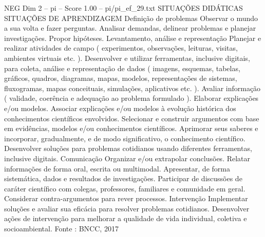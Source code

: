 \begin{textsample}{NEG Dim 2 – pi – Score 1.00 – pi/pi\_ef\_29.txt}  \label{ex:f2_neg_198}
SITUAÇÕES DIDÁTICAS SITUAÇÕES DE APRENDIZAGEM Definição de problemas Observar o mundo a sua volta e fazer perguntas.
Analisar demandas, delinear problemas e planejar investigações.
Propor hipóteses.
Levantamento, análise e representação Planejar e realizar atividades de campo ( experimentos, observações, leituras, visitas, ambientes virtuais etc. ).
Desenvolver e utilizar ferramentas, inclusive digitais, para coleta, análise e representação de dados ( imagens, esquemas, tabelas, gráficos, quadros, diagramas, mapas, modelos, representações de sistemas, fluxogramas, mapas conceituais, simulações, aplicativos etc. ).
Avaliar informação ( validade, coerência e adequação ao problema formulado ).
Elaborar explicações e/ou modelos.
Associar explicações e/ou modelos à evolução histórica dos conhecimentos científicos envolvidos.
Selecionar e construir argumentos com base em evidências, modelos e/ou conhecimentos científicos.
Aprimorar seus saberes e incorporar, gradualmente, e de modo significativo, o conhecimento científico.
Desenvolver soluções para problemas cotidianos usando diferentes ferramentas, inclusive digitais.
Comunicação Organizar e/ou extrapolar conclusões.
Relatar informações de forma oral, escrita ou multimodal.
Apresentar, de forma sistemática, dados e resultados de investigações.
Participar de discussões de caráter científico com colegas, professores, familiares e comunidade em geral.
Considerar contra-argumentos para rever processos.
Intervenção Implementar soluções e avaliar sua eficácia para resolver problemas cotidianos.
Desenvolver ações de intervenção para melhorar a qualidade de vida individual, coletiva e socioambiental.
Fonte : BNCC, 2017

\end{textsample}
